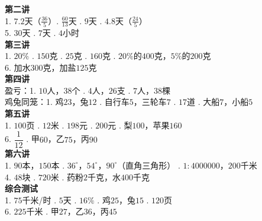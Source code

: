 \documentclass[a4paper,12pt]{ctexart}
\begin{document}
\textbf{第二讲}
\noindent\\
1. $7.2$天（$\frac{36}{5}$）. $\frac{60}{13}$天 . $9$天 . $4.8$天（$\frac{24}{5}$）\\
5. $30$天 . $7$天 . $4$小时\\

\textbf{第三讲}
\noindent\\
1. $20\%$ . $150$克 . $25$克 . $160$克 . $20\%$的$400$克，$5\%$的$200$克\\
6. 加水$300$克，加盐$125$克\\

\textbf{第四讲}
\noindent\\
盈亏：1. $10$人，$38$个 . $4$人，$26$支 . $7$人，$38$棵\\
鸡兔同笼：1. 鸡$23$，兔$12$ . 自行车$5$，三轮车$7$ . $17$道 . 大船$7$，小船$5$\\

\textbf{第五讲}
\noindent\\
1. $100$页 . $12$米 . $198$元 . $200$元 . 梨$100$，苹果$160$\\
6. $\dfrac{1}{12}$ . 甲$60$，乙$75$，丙$90$\\

\textbf{第六讲}
\noindent\\
1. $90$本，$150$本 . $36^\circ$，$54^\circ$，$90^\circ$（直角三角形） . $1:4000000$，$200$千米\\
4. $48$块 . $720$米 . 药粉$2$千克，水$400$千克\\

\textbf{综合测试}
\noindent\\
1. $75$千米/时 . $5$天 . $16\%$ . 鸡$25$，兔$15$ . $120$页\\
6. $225$千米 . 甲$27$，乙$36$，丙$45$
\end{document}
